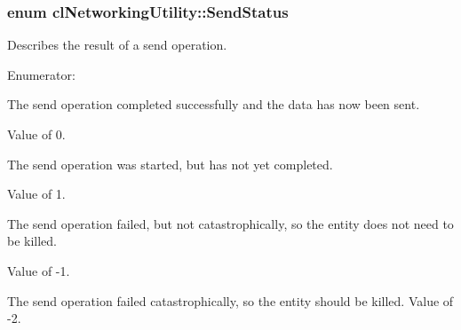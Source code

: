\hypertarget{classcl_networking_utility_a19389cda12603396e03caa9d82073803}{
\subsubsection[{SendStatus}]{\setlength{\rightskip}{0pt plus 5cm}enum {\bf clNetworkingUtility::SendStatus}}}
\label{classcl_networking_utility_a19389cda12603396e03caa9d82073803}
Describes the result of a send operation. \begin{Desc}
\item[Enumerator: ]\par
\begin{description}
\item[{\em 
\hypertarget{classcl_networking_utility_a19389cda12603396e03caa9d82073803abaa42412f2920363cef741fd5b2e202a}{
SEND\_\-COMPLETED}
\label{classcl_networking_utility_a19389cda12603396e03caa9d82073803abaa42412f2920363cef741fd5b2e202a}
}]The send operation completed successfully and the data has now been sent. \par
 Value of 0. \item[{\em 
\hypertarget{classcl_networking_utility_a19389cda12603396e03caa9d82073803a807b2f9dcc901c6012549316bccfe407}{
SEND\_\-IN\_\-PROGRESS}
\label{classcl_networking_utility_a19389cda12603396e03caa9d82073803a807b2f9dcc901c6012549316bccfe407}
}]The send operation was started, but has not yet completed.\par
 Value of 1. \item[{\em 
\hypertarget{classcl_networking_utility_a19389cda12603396e03caa9d82073803a583b1181229130ff739548c8f8de363c}{
SEND\_\-FAILED}
\label{classcl_networking_utility_a19389cda12603396e03caa9d82073803a583b1181229130ff739548c8f8de363c}
}]The send operation failed, but not catastrophically, so the entity does not need to be killed.\par
 Value of -\/1. \item[{\em 
\hypertarget{classcl_networking_utility_a19389cda12603396e03caa9d82073803ab06ce588df19988e79b503398b720c79}{
SEND\_\-FAILED\_\-KILL}
\label{classcl_networking_utility_a19389cda12603396e03caa9d82073803ab06ce588df19988e79b503398b720c79}
}]The send operation failed catastrophically, so the entity should be killed. Value of -\/2. \end{description}
\end{Desc}



